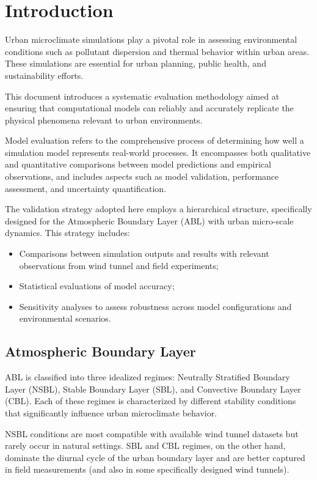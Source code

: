 \section{Introduction}
Urban microclimate simulations play a pivotal role in assessing environmental conditions such as pollutant dispersion and thermal behavior within urban areas. These simulations are essential for urban planning, public health, and sustainability efforts.

This document introduces a systematic evaluation methodology aimed at ensuring that computational models can reliably and accurately replicate the physical phenomena relevant to urban environments.

Model evaluation refers to the comprehensive process of determining how well a simulation model represents real-world processes. It encompasses both qualitative and quantitative comparisons between model predictions and empirical observations, and includes aspects such as model validation, performance assessment, and uncertainty quantification.

The validation strategy adopted here employs a hierarchical structure, specifically designed for the Atmospheric Boundary Layer (ABL) with urban micro-scale dynamics. This strategy includes:

\begin{itemize}
    \item Comparisons between simulation outputs and results with relevant observations from wind tunnel and field experiments;
    \item Statistical evaluations of model accuracy;
    \item Sensitivity analyses to assess robustness across model configurations and environmental scenarios.
\end{itemize}

\subsection{Atmospheric Boundary Layer}
ABL is classified into three idealized regimes: Neutrally Stratified Boundary Layer (NSBL), Stable Boundary Layer (SBL), and Convective Boundary Layer (CBL). Each of these regimes is characterized by different stability conditions that significantly influence urban microclimate behavior.

NSBL conditions are most compatible with available wind tunnel datasets but rarely occur in natural settings. SBL and CBL regimes, on the other hand, dominate the diurnal cycle of the urban boundary layer and are better captured in field measurements (and also in some specifically designed wind tunnels).

